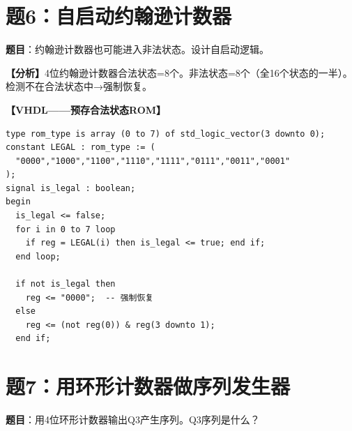 \section{题6：自启动约翰逊计数器}

\textbf{题目}：约翰逊计数器也可能进入非法状态。设计自启动逻辑。

\begin{solution}[完整解答]

\textbf{【分析】}4位约翰逊计数器合法状态=8个。非法状态=8个（全16个状态的一半）。检测不在合法状态中→强制恢复。

\textbf{【VHDL——预存合法状态ROM】}
\begin{lstlisting}
type rom_type is array (0 to 7) of std_logic_vector(3 downto 0);
constant LEGAL : rom_type := (
  "0000","1000","1100","1110","1111","0111","0011","0001"
);
signal is_legal : boolean;
begin
  is_legal <= false;
  for i in 0 to 7 loop
    if reg = LEGAL(i) then is_legal <= true; end if;
  end loop;

  if not is_legal then
    reg <= "0000";  -- 强制恢复
  else
    reg <= (not reg(0)) & reg(3 downto 1);
  end if;
\end{lstlisting}

\end{solution}


\section{题7：用环形计数器做序列发生器}

\textbf{题目}：用4位环形计数器输出Q3产生序列。Q3序列是什么？

